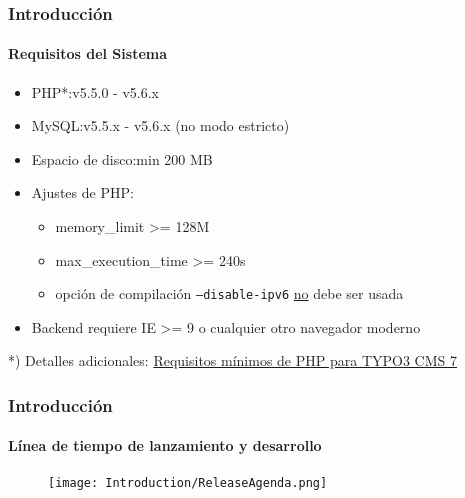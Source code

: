 
\begin{frame}[fragile]
	\frametitle{Introducción}
	\framesubtitle{Requisitos del Sistema}

	\begin{itemize}
		\item PHP*:\tabto{2.2cm}v5.5.0 - v5.6.x
		\item MySQL:\tabto{2.2cm}v5.5.x - v5.6.x (no modo estricto)
		\item Espacio de disco:\tabto{2.2cm}min 200 MB
		\item Ajustes de PHP:

			\begin{itemize}
				\item memory\_limit >= 128M
				\item max\_execution\_time >= 240s
				\item opción de compilación \texttt{--disable-ipv6} \underline{no} debe ser usada
			\end{itemize}

		\item Backend requiere IE >= 9 o cualquier otro navegador moderno

	\end{itemize}

	\vspace{1cm}
	*) Detalles adicionales: \href{http://typo3.org/news/article/php-minimum-requirements-for-typo3-cms-7/}{Requisitos mínimos de PHP para TYPO3 CMS 7}

\end{frame}


\begin{frame}[fragile]
	\frametitle{Introducción}
	\framesubtitle{Línea de tiempo de lanzamiento y desarrollo}

	\begin{figure}
		\texttt{[image: Introduction/ReleaseAgenda.png]}
	\end{figure}

\end{frame}

